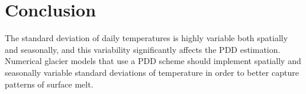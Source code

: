 \documentclass[twocolumn]{igs}
\begin{document}
\section{Conclusion}

The standard deviation of daily temperatures is highly variable both spatially and seasonally, and this variability significantly affects the PDD estimation. Numerical glacier models that use a PDD scheme should implement spatially and seasonally variable standard deviations of temperature in order to better capture patterns of surface melt.



\end{document}
